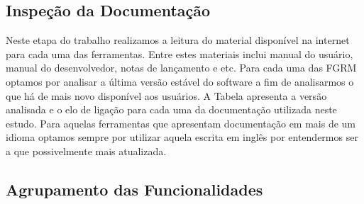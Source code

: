 \begin{table}[ht]
	\centering
	\caption{Ferramentas e serviços da Internet selecionados.}
	\label{tab:ferramentas_selecionadas}
\end{table}

\subsection{Inspeção da Documentação}
\label{ssub:Inspeção da Documentação}

Neste etapa do trabalho realizamos a leitura do material disponível na internet
para cada uma das ferramentas. Entre estes materiais inclui manual do usuário,
manual do desenvolvedor, notas de lançamento e etc. Para cada uma das FGRM
optamos por analisar a última versão estável do software a fim de analisarmos o
que há de mais novo disponível aos usuários. A Tabela apresenta a versão
analisada e o elo de ligação para cada uma da documentação utilizada neste
estudo. Para aquelas ferramentas que apresentam documentação em mais de um
idioma optamos sempre por utilizar aquela escrita em inglês por entendermos ser
a que possivelmente mais atualizada.

\subsection{Agrupamento das Funcionalidades}
\label{ssub:Agrupamento das Funcionalidades}

